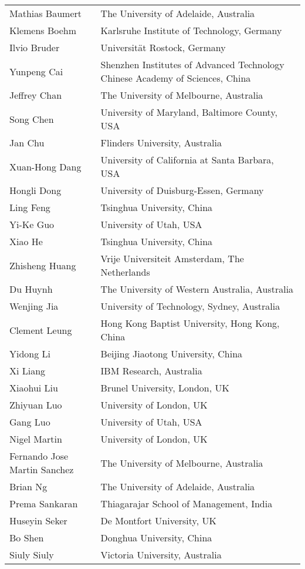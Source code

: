\documentclass{llncs}
\begin{document}
\begin{tabular}{@{}p{5cm}@{}p{7.2cm}@{}}
Mathias	Baumert	& The University of Adelaide, Australia\\
Klemens	Boehm	&	Karlsruhe Institute of Technology, Germany\\
Ilvio	Bruder	& Universit\"{a}t Rostock, Germany\\
Yunpeng	Cai	& Shenzhen Institutes of Advanced Technology \hfil\break Chinese Academy of Sciences, China \\
Jeffrey	Chan	&	The University of Melbourne, Australia \\
Song	Chen &	University of Maryland, Baltimore County, USA\\
Jan	Chu	& Flinders University, Australia \\
Xuan-Hong	Dang &	University of California at Santa Barbara, USA \\
Hongli Dong  & University of Duisburg-Essen, Germany \\
Ling	Feng	& Tsinghua University, China \\
Yi-Ke	Guo	& University of Utah, USA \\
Xiao He & Tsinghua University, China \\
Zhisheng Huang  &  Vrije Universiteit Amsterdam, The Netherlands \\
Du	Huynh	& The University of Western Australia, Australia \\
Wenjing	Jia	&	University of Technology, Sydney, Australia \\
Clement	Leung	& Hong Kong Baptist University, Hong Kong, China \\
Yidong	Li	& Beijing Jiaotong University, China \\
Xi Liang & IBM Research, Australia \\
Xiaohui	Liu	& Brunel University, London, UK \\
Zhiyuan Luo &   University of London, UK \\
Gang	Luo	&	University of Utah, USA \\
Nigel Martin & University of London, UK \\
Fernando Jose	Martin Sanchez	& The University of Melbourne, Australia \\
Brian	Ng	& The University of Adelaide, Australia \\ 
Prema	Sankaran &	Thiagarajar School of Management, India \\
Huseyin	Seker	&	De Montfort University, UK \\
Bo	Shen	& Donghua University, China \\
Siuly	Siuly	& Victoria University, Australia \\
\end{tabular}
\end{document}
